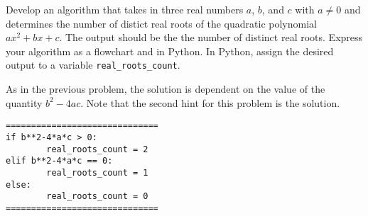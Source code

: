 \documentclass{ximera}
\begin{document}
\begin{question}
	Develop an algorithm that takes in three real numbers $a$, $b$, and $c$ with $a\neq 0$ and determines the number of distict real roots of the quadratic polynomial $ax^2+bx+c$. The output should be the the number of distinct real roots. Express your algorithm as a flowchart and in Python. In Python, assign the desired output to a variable \verb|real_roots_count|.
	\begin{hint}
	As in the previous problem, the solution is dependent on the value of the quantity $b^2-4ac$. Note that the second hint for this problem is the solution.
	\end{hint}
	\begin{hint}
            \begin{center}
           \end{center}
\begin{verbatim}
==============================
if b**2-4*a*c > 0:
        real_roots_count = 2
elif b**2-4*a*c == 0:
        real_roots_count = 1
else:
        real_roots_count = 0
==============================
\end{verbatim}
	\end{hint}
\end{question}
\end{document}
